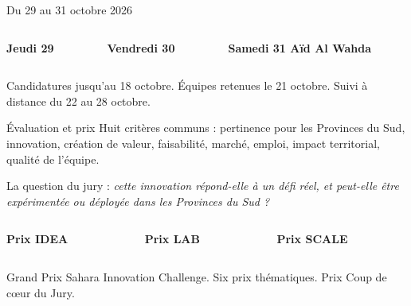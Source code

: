 \documentclass[aspectratio=169,11pt]{beamer}
\newcommand{\card}[2]{%
  \colorbox{cream2}{\parbox[t]{0.94\linewidth}{{\sffamily\scriptsize\bfseries\color{gold}#1}\par\vspace{1mm}{\small #2}}}%
}
\begin{document}
\begin{frame}{Du 29 au 31 octobre 2026}
  \begin{columns}[T]
    \begin{column}{0.32\textwidth}\card{Jeudi 29}{C\'er\'emonie d'ouverture et lancement. Conf\'erence inaugurale. L'apr\`es-midi : Project Clinics, \'equipe par \'equipe.}\end{column}
    \begin{column}{0.32\textwidth}\card{Vendredi 30}{Bootcamp : proposition de valeur, business model, pitch. L'apr\`es-midi : mise en pratique et coaching.}\end{column}
    \begin{column}{0.32\textwidth}\card{Samedi 31 \enspace A\"id Al Wahda}{Matin : coaching final. Apr\`es-midi : Final Pitches, d\'elib\'eration du jury, remise des prix.}\end{column}
  \end{columns}
  \vspace{3mm}
  {\footnotesize\color{muted} Candidatures jusqu'au 18 octobre. \'Equipes retenues le 21 octobre. Suivi \`a distance du 22 au 28 octobre.}
\end{frame}

\begin{frame}{\'Evaluation et prix}
  {\small Huit crit\`eres communs : pertinence pour les Provinces du Sud, innovation, cr\'eation de valeur, faisabilit\'e, march\'e, emploi, impact territorial, qualit\'e de l'\'equipe.}\par\vspace{2mm}
  {\small La question du jury : \textit{cette innovation r\'epond-elle \`a un d\'efi r\'eel, et peut-elle \^etre exp\'eriment\'ee ou d\'eploy\'ee dans les Provinces du Sud ?}}\par\vspace{3mm}
  \begin{columns}[T]
    \begin{column}{0.32\textwidth}\card{Prix IDEA}{Best Emerging Innovation}\end{column}
    \begin{column}{0.32\textwidth}\card{Prix LAB}{Best Research Valorization}\end{column}
    \begin{column}{0.32\textwidth}\card{Prix SCALE}{Best Market \& Deployment}\end{column}
  \end{columns}
  \vspace{2mm}
  {\footnotesize\color{muted} Grand Prix Sahara Innovation Challenge. Six prix th\'ematiques. Prix Coup de c\oe ur du Jury.}
\end{frame}
\end{document}

